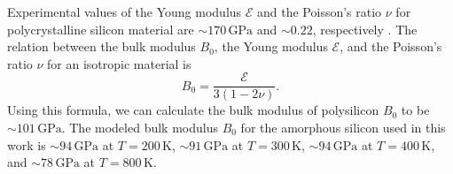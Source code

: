 Experimental values of the Young modulus $\mathcal{E}$ and the Poisson's ratio
$\nu$ for polycrystalline silicon material are $\sim 170 \, \mathrm{GPa}$ and
$\sim 0.22$, respectively \cite{Freund_Suresh_2003}. The relation between the
bulk modulus $B_0$, the Young modulus $\mathcal{E}$, and the Poisson's ratio
$\nu$ for an isotropic material is
\begin{equation}
  B_0 = \frac{\mathcal{E}}{3(1 - 2\nu)}.
\end{equation}
Using this formula, we can calculate the bulk modulus of polysilicon $B_0$ to
be $\sim 101 \, \mathrm{GPa}$. The modeled bulk modulus $B_0$ for the
amorphous silicon used in this work is
$\sim 94 \, \mathrm{GPa}$ at $T = 200 \, \mathrm{K}$,
$\sim 91 \, \mathrm{GPa}$ at $T = 300 \, \mathrm{K}$,
$\sim 94 \, \mathrm{GPa}$ at $T = 400 \, \mathrm{K}$,
and $\sim 78 \, \mathrm{GPa}$ at $T = 800 \, \mathrm{K}$.

